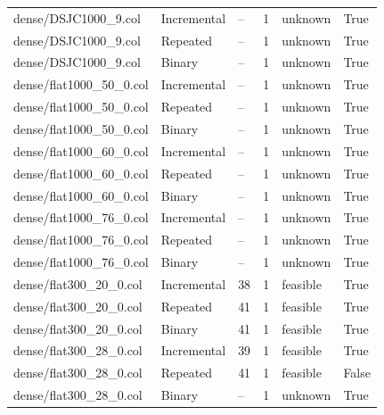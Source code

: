 \begin{table}[htbp]
\begin{tabular}{llllll}
dense/DSJC1000\_9.col & Incremental & -- & 1 & unknown & True \\
dense/DSJC1000\_9.col & Repeated & -- & 1 & unknown & True \\
dense/DSJC1000\_9.col & Binary & -- & 1 & unknown & True \\
dense/flat1000\_50\_0.col & Incremental & -- & 1 & unknown & True \\
dense/flat1000\_50\_0.col & Repeated & -- & 1 & unknown & True \\
dense/flat1000\_50\_0.col & Binary & -- & 1 & unknown & True \\
dense/flat1000\_60\_0.col & Incremental & -- & 1 & unknown & True \\
dense/flat1000\_60\_0.col & Repeated & -- & 1 & unknown & True \\
dense/flat1000\_60\_0.col & Binary & -- & 1 & unknown & True \\
dense/flat1000\_76\_0.col & Incremental & -- & 1 & unknown & True \\
dense/flat1000\_76\_0.col & Repeated & -- & 1 & unknown & True \\
dense/flat1000\_76\_0.col & Binary & -- & 1 & unknown & True \\
dense/flat300\_20\_0.col & Incremental & 38 & 1 & feasible & True \\
dense/flat300\_20\_0.col & Repeated & 41 & 1 & feasible & True \\
dense/flat300\_20\_0.col & Binary & 41 & 1 & feasible & True \\
dense/flat300\_28\_0.col & Incremental & 39 & 1 & feasible & True \\
dense/flat300\_28\_0.col & Repeated & 41 & 1 & feasible & False \\
dense/flat300\_28\_0.col & Binary & -- & 1 & unknown & True \\
\hline
\end{tabular}
\end{table}
